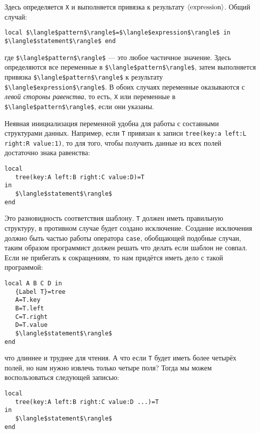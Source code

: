 Здесь определяется \lstinline|X| и выполняется привязка к результату $\langle \text{\lstinline|expression|} \rangle$. Общий случай:

\begin{lstlisting}
local $\langle$pattern$\rangle$=$\langle$expression$\rangle$ in $\langle$statement$\rangle$ end
\end{lstlisting}

где \lstinline|$\langle$pattern$\rangle$| --- это любое частичное значение. Здесь определяются все переменные в \lstinline|$\langle$pattern$\rangle$|, затем выполняется привязка \lstinline|$\langle$pattern$\rangle$| к результату \lstinline|$\langle$expression$\rangle$|. В обоих случаях переменные оказываются с \emph{левой стороны равенства}, то есть, \lstinline|X| или переменные в \lstinline|$\langle$pattern$\rangle$|, если они указаны.

Неявная инициализация переменной удобна для работы с составными структурами данных. Например, если \lstinline|T| привязан к записи \lstinline|tree(key:a left:L right:R value:1)|, то для того, чтобы получить данные из всех полей достаточно знака равенства:

\begin{lstlisting}
local
   tree(key:A left:B right:C value:D)=T
in
   $\langle$statement$\rangle$
end
\end{lstlisting}

Это разновидность соответствия шаблону. \lstinline|T| должен иметь правильную структуру, в противном случае будет создано исключение. Создание исключения должно быть частью работы оператора \lstinline|case|, обобщающей подобные случаи, таким образом программист должен решать что делать если шаблон не совпал. Если не прибегать к сокращениям, то нам придётся иметь дело с такой программой:

\begin{lstlisting}
local A B C D in
   {Label T}=tree
   A=T.key
   B=T.left
   C=T.right
   D=T.value
   $\langle$statement$\rangle$
end
\end{lstlisting}

что длиннее и труднее для чтения. А что если \lstinline|T| будет иметь более четырёх полей, но нам нужно извлечь только четыре поля? Тогда мы можем воспользоваться следующей записью:

\begin{lstlisting}
local
   tree(key:A left:B right:C value:D ...)=T
in
   $\langle$statement$\rangle$
end
\end{lstlisting}

